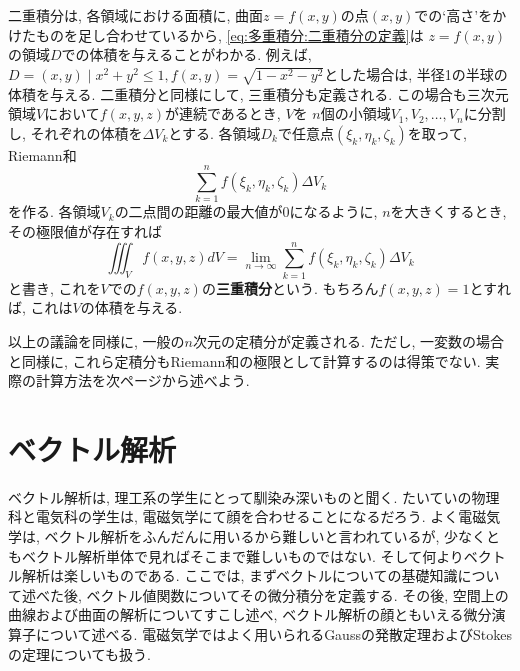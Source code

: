 \documentclass[a4j,dvipdfmx]{jsarticle}
\numberwithin{equation}{section}
\begin{document}
            二重積分は, 各領域における面積に, 曲面$z=f(x,y)$の点$(x,y)$での`高さ'をかけたものを足し合わせているから, \eqref{eq:多重積分:二重積分の定義}は
            $z=f(x,y)$の領域$D$での体積を与えることがわかる. 例えば, $D={(x,y)\mid x^2+y^2\leq 1},f(x,y)=\sqrt{1-x^2-y^2}$とした場合は, 
            半径1の半球の体積を与える.
            \clearpage
            二重積分と同様にして, 三重積分も定義される. この場合も三次元領域$V$において$f(x,y,z)$が連続であるとき, $V$を
            $n$個の小領域$V_1,V_2,\dots,V_n$に分割し, それぞれの体積を$\Delta V_k$とする. 各領域$D_k$で任意点$(\xi_k,\eta_k,\zeta_k)$を取って, Riemann和
            \begin{equation}
                \sum_{k=1}^nf(\xi_k,\eta_k,\zeta_k)\Delta V_k
            \end{equation} 
            を作る. 各領域$V_k$の二点間の距離の最大値が0になるように, $n$を大きくするとき, その極限値が存在すれば
            \begin{equation}
                \iiint_Vf(x,y,z)dV=\lim_{n\to\infty}\sum_{k=1}^nf(\xi_k,\eta_k,\zeta_k)\Delta V_k
            \end{equation}
            と書き, これを$V$での$f(x,y,z)$の\textbf{三重積分}という. もちろん$f(x,y,z)=1$とすれば, 
            これは$V$の体積を与える.

            以上の議論を同様に, 一般の$n$次元の定積分が定義される. ただし, 一変数の場合と同様に, これら定積分もRiemann和の極限として計算するのは得策でない.
            実際の計算方法を次ページから述べよう.

    \clearpage
    
    \part{ベクトル解析}
    \begin{screen}
        ベクトル解析は, 理工系の学生にとって馴染み深いものと聞く. たいていの物理科と電気科の学生は, 電磁気学にて顔を合わせることになるだろう.
        よく電磁気学は, ベクトル解析をふんだんに用いるから難しいと言われているが, 少なくともベクトル解析単体で見ればそこまで難しいものではない. 
        そして何よりベクトル解析は楽しいものである. ここでは, まずベクトルについての基礎知識について述べた後, ベクトル値関数についてその微分積分を定義する.
        その後, 空間上の曲線および曲面の解析についてすこし述べ, ベクトル解析の顔ともいえる微分演算子について述べる.
        電磁気学ではよく用いられるGaussの発散定理およびStokesの定理についても扱う. 
    \end{screen}
    \clearpage
\end{document}
